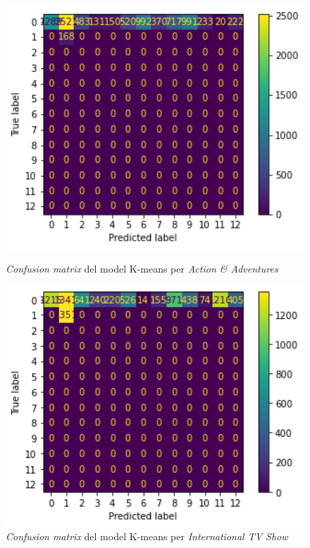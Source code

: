 \documentclass[a4paper, 11pt]{article}
\begin{document}
\begin{figure}[h] %
\begin{minipage}{5cm} %
\begin{center}
    \includegraphics[width=1\textwidth]{ConfMatrix/CM_KM_Action.png}
    \caption{\textit{Confusion matrix} del model K-means per \textit{Action \& Adventures}}
    \includegraphics[width=1\textwidth]{ConfMatrix/CM_KM_InternationalTV.png}
    \caption{\textit{Confusion matrix} del model K-means per \textit{International TV Show}}
\end{center}

\end{minipage}
\end{figure}
\end{document}
